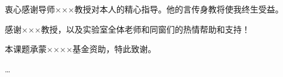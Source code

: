 \makeatletter
{}
  \pagestyle{fancy}%
  \fancyhf{}
\makeatother

\begin{thanks}
衷心感谢导师×××教授对本人的精心指导。他的言传身教将使我终生受益。

感谢×××教授，以及实验室全体老师和同窗们的热情帮助和支持！

本课题承蒙××××基金资助，特此致谢。

…

\end{thanks}

